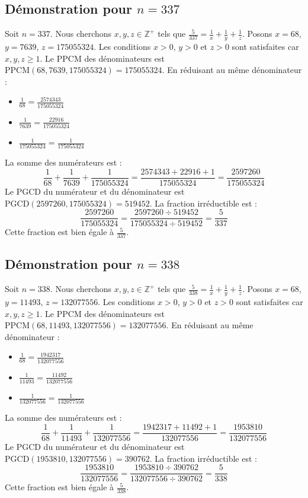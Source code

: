 \documentclass[11pt,a4paper]{article}
\begin{document}
\subsection{Démonstration pour $n = 337$}
Soit $n = 337$. Nous cherchons $x, y, z \in \mathbb{Z}^{+}$ tels que $\frac{5}{337} = \frac{1}{x} + \frac{1}{y} + \frac{1}{z}$.
Posons $x = 68$, $y = 7639$, $z = 175055324$.
Les conditions $x > 0$, $y > 0$ et $z > 0$ sont satisfaites car $x, y, z \geq 1$.
Le PPCM des dénominateurs est $\text{PPCM}(68, 7639, 175055324) = 175055324$.
En réduisant au même dénominateur :
\begin{itemize}
    \item $\frac{1}{68} = \frac{2574343}{175055324}$
    \item $\frac{1}{7639} = \frac{22916}{175055324}$
    \item $\frac{1}{175055324} = \frac{1}{175055324}$
\end{itemize}
La somme des numérateurs est :
$$ \frac{1}{68} + \frac{1}{7639} + \frac{1}{175055324} = \frac{2574343 + 22916 + 1}{175055324} = \frac{2597260}{175055324} $$
Le PGCD du numérateur et du dénominateur est $\text{PGCD}(2597260, 175055324) = 519452$.
La fraction irréductible est :
$$ \frac{2597260}{175055324} = \frac{2597260 \div 519452}{175055324 \div 519452} = \frac{5}{337} $$
Cette fraction est bien égale à $\frac{5}{337}$.

\subsection{Démonstration pour $n = 338$}
Soit $n = 338$. Nous cherchons $x, y, z \in \mathbb{Z}^{+}$ tels que $\frac{5}{338} = \frac{1}{x} + \frac{1}{y} + \frac{1}{z}$.
Posons $x = 68$, $y = 11493$, $z = 132077556$.
Les conditions $x > 0$, $y > 0$ et $z > 0$ sont satisfaites car $x, y, z \geq 1$.
Le PPCM des dénominateurs est $\text{PPCM}(68, 11493, 132077556) = 132077556$.
En réduisant au même dénominateur :
\begin{itemize}
    \item $\frac{1}{68} = \frac{1942317}{132077556}$
    \item $\frac{1}{11493} = \frac{11492}{132077556}$
    \item $\frac{1}{132077556} = \frac{1}{132077556}$
\end{itemize}
La somme des numérateurs est :
$$ \frac{1}{68} + \frac{1}{11493} + \frac{1}{132077556} = \frac{1942317 + 11492 + 1}{132077556} = \frac{1953810}{132077556} $$
Le PGCD du numérateur et du dénominateur est $\text{PGCD}(1953810, 132077556) = 390762$.
La fraction irréductible est :
$$ \frac{1953810}{132077556} = \frac{1953810 \div 390762}{132077556 \div 390762} = \frac{5}{338} $$
Cette fraction est bien égale à $\frac{5}{338}$.
\end{document}
